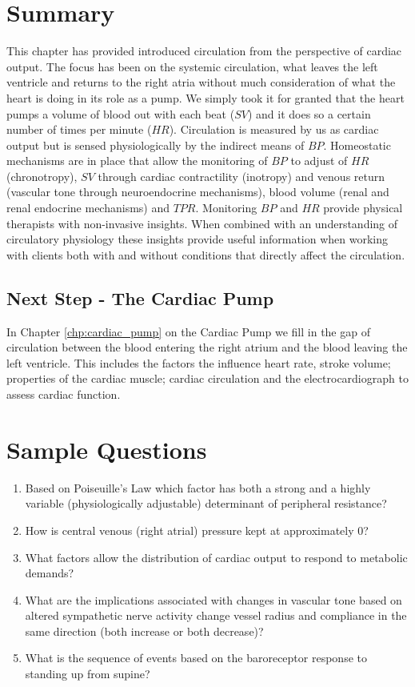 \section{Summary}

This chapter has provided introduced circulation from the perspective of cardiac output. The focus has been on the systemic circulation, what leaves the left ventricle and returns to the right atria without much consideration of what the heart is doing in its role as a pump. We simply took it for granted that the heart pumps a volume of blood out with each beat ($SV$) and it does so a certain number of times per minute ($HR$). 
Circulation is measured by us as cardiac output but is sensed physiologically by the indirect means of $BP$. Homeostatic mechanisms are in place that allow the monitoring of $BP$ to adjust of $HR$ (chronotropy), $SV$ through cardiac contractility (inotropy) and venous return (vascular tone through neuroendocrine mechanisms), blood volume (renal and renal endocrine mechanisms) and $TPR$. Monitoring $BP$ and $HR$ provide physical therapists with non-invasive insights. When combined with an understanding of circulatory physiology these insights provide useful information when working with clients both with and without conditions that directly affect the circulation.

\subsection*{Next Step - The Cardiac Pump}

In Chapter \ref{chp:cardiac_pump} on the Cardiac Pump we fill in the gap of circulation between the blood entering the right atrium and the blood leaving the left ventricle. This includes the factors the influence heart rate, stroke volume; properties of the cardiac muscle; cardiac circulation and the electrocardiograph to assess cardiac function.

\printbibliography[heading=subbibintoc]

\section*{Sample Questions}

\begin{enumerate}
    \item Based on Poiseuille’s Law which factor has both a strong and a highly variable (physiologically adjustable) determinant of peripheral resistance?
    \item How is central venous (right atrial) pressure kept at approximately 0?
    \item What factors allow the distribution of cardiac output to respond to metabolic demands?
    \item What are the implications associated with changes in vascular tone based on altered sympathetic nerve activity change vessel radius and compliance in the same direction (both increase or both decrease)?
    \item What is the sequence of events based on the baroreceptor response to standing up from supine?
\end{enumerate} 